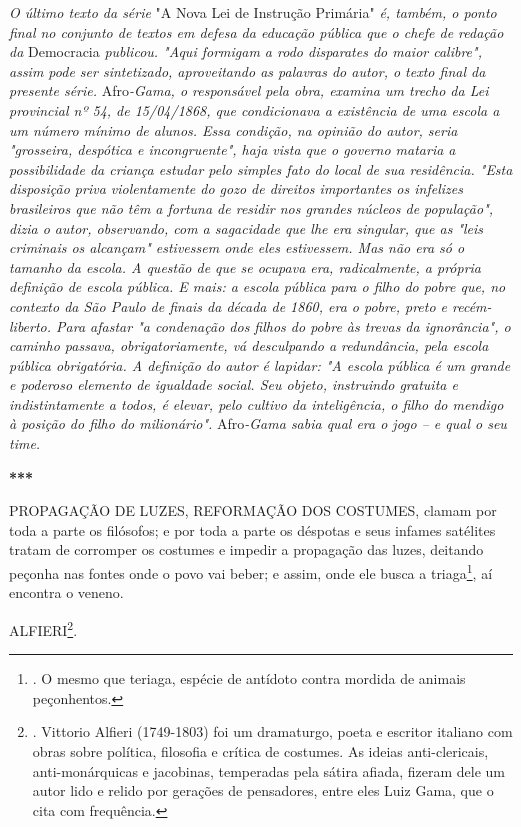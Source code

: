 \emph{O último texto da série} "A Nova Lei de Instrução Primária"
\emph{é, também, o ponto final no conjunto de textos em defesa da
educação pública que o chefe de redação da} Democracia \emph{publicou.
"Aqui formigam a rodo disparates do maior calibre", assim pode ser
sintetizado, aproveitando as palavras do autor, o texto final da
presente série.} Afro\emph{-Gama, o responsável pela obra, examina um
trecho da Lei provincial nº 54, de 15/04/1868, que condicionava a
existência de uma escola a um número mínimo de alunos. Essa condição, na
opinião do autor, seria "grosseira, despótica e incongruente", haja
vista que o governo mataria a possibilidade da criança estudar pelo
simples fato do local de sua residência. "Esta disposição priva
violentamente do gozo de direitos importantes os infelizes brasileiros
que não têm a fortuna de residir nos grandes núcleos de população",
dizia o autor, observando, com a sagacidade que lhe era singular, que as
"leis criminais os alcançam" estivessem onde eles estivessem. Mas não
era só o tamanho da escola. A questão de que se ocupava era,
radicalmente, a própria definição de escola pública. E mais: a escola
pública para o filho do pobre que, no contexto da São Paulo de finais da
década de 1860, era o pobre, preto e recém-liberto. Para afastar "a
condenação dos filhos do pobre às trevas da ignorância", o caminho
passava, obrigatoriamente, vá desculpando a redundância, pela escola
pública obrigatória. A definição do autor é lapidar: "A escola pública é
um grande e poderoso elemento de igualdade social. Seu objeto,
instruindo gratuita e indistintamente a todos, é elevar, pelo cultivo da
inteligência, o filho do mendigo à posição do filho do milionário".}
Afro\emph{-Gama sabia qual era o jogo -- e qual o seu time.}

\textbf{***}

PROPAGAÇÃO DE LUZES, REFORMAÇÃO DOS COSTUMES, clamam por toda a parte os
filósofos; e por toda a parte os déspotas e seus infames satélites
tratam de corromper os costumes e impedir a propagação das luzes,
deitando peçonha nas fontes onde o povo vai beber; e assim, onde ele
busca a triaga\footnote{. O mesmo que teriaga, espécie de antídoto
  contra mordida de animais peçonhentos.}, aí encontra o veneno.

ALFIERI\footnote{. Vittorio Alfieri (1749-1803) foi um dramaturgo, poeta
  e escritor italiano com obras sobre política, filosofia e crítica de
  costumes. As ideias anti-clericais, anti-monárquicas e jacobinas,
  temperadas pela sátira afiada, fizeram dele um autor lido e relido por
  gerações de pensadores, entre eles Luiz Gama, que o cita com
  frequência.}.

